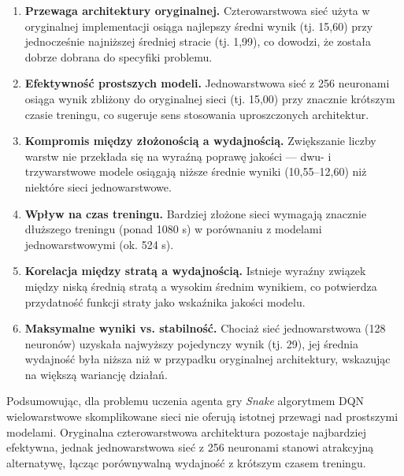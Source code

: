 \documentclass[a4paper,12pt]{article}
\begin{document}
\begin{enumerate}
  \item \textbf{Przewaga architektury oryginalnej.}  
    Czterowarstwowa sieć użyta w oryginalnej implementacji osiąga najlepszy średni wynik (tj. 15,60) przy jednocześnie najniższej średniej stracie (tj. 1,99), co dowodzi, że została dobrze dobrana do specyfiki problemu.

  \item \textbf{Efektywność prostszych modeli.}  
    Jednowarstwowa sieć z 256 neuronami osiąga wynik zbliżony do oryginalnej sieci (tj. 15,00) przy znacznie krótszym czasie treningu, co sugeruje sens stosowania uproszczonych architektur.

  \item \textbf{Kompromis między złożonością a wydajnością.}  
    Zwiększanie liczby warstw nie przekłada się na wyraźną poprawę jakości — dwu- i trzywarstwowe modele osiągają niższe średnie wyniki (10,55–12,60) niż niektóre sieci jednowarstwowe.

  \item \textbf{Wpływ na czas treningu.}  
    Bardziej złożone sieci wymagają znacznie dłuższego treningu (ponad 1080 s) w porównaniu z modelami jednowarstwowymi (ok. 524 s).

  \item \textbf{Korelacja między stratą a wydajnością.}  
    Istnieje wyraźny związek między niską średnią stratą a wysokim średnim wynikiem, co potwierdza przydatność funkcji straty jako wskaźnika jakości modelu.

  \item \textbf{Maksymalne wyniki vs. stabilność.}  
    Chociaż sieć jednowarstwowa (128 neuronów) uzyskała najwyższy pojedynczy wynik (tj. 29), jej średnia wydajność była niższa niż w przypadku oryginalnej architektury, wskazując na większą wariancję działań.
\end{enumerate}

\noindent
Podsumowując, dla problemu uczenia agenta gry \emph{Snake} algorytmem DQN wielowarstwowe skomplikowane sieci nie oferują istotnej przewagi nad prostszymi modelami. Oryginalna czterowarstwowa architektura pozostaje najbardziej efektywna, jednak jednowarstwowa sieć z 256 neuronami stanowi atrakcyjną alternatywę, łącząc porównywalną wydajność z krótszym czasem treningu.
\end{document}
